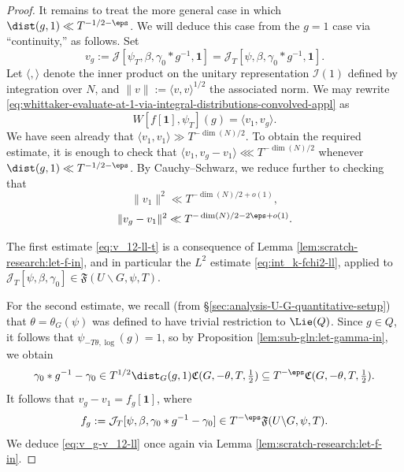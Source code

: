 \begin{proof}
  It remains to treat the more general case in which $\dist(g,1) \ll T^{-1/2-\eps}$.  We will deduce this case from the $g = 1$ case via ``continuity,'' as follows.  Set
  \begin{equation*}
    v_g := \mathcal{J}[\psi_T,\beta,\gamma_0 \ast g^{-1}, \mathbf{1}] = \mathcal{J}_T[\psi,\beta,\gamma_0 \ast g^{-1}, \mathbf{1}].
  \end{equation*}
  Let $\langle ,  \rangle$ denote the inner product on the unitary representation $\mathcal{I}(1)$ defined by integration over $N$, and $\|v\| := \langle v, v \rangle^{1/2}$ the associated norm.  We may rewrite \eqref{eq:whittaker-evaluate-at-1-via-integral-distributions-convolved-appl} as
  \begin{equation*}
    W[f[\mathbf{1}], \psi_T](g) = \langle v_1, v_g \rangle.
  \end{equation*}
  We have seen already that $\langle v_1, v_1 \rangle \gg T^{-\dim(N)/2}$.  To obtain the required estimate, it is enough to check that $\langle v_1, v_g - v_1 \rangle \lll T^{-\dim(N)/2}$ whenever $\dist(g,1) \ll T^{-1/2-\eps}$.  By Cauchy--Schwarz, we reduce further to checking that
  \begin{equation}\label{eq:v_12-ll-t}
    \|v_1\|^2 \ll T^{-\dim(N)/2 + o(1)},
  \end{equation}
  \begin{equation}\label{eq:v_g-v_12-ll}
    \|v_g - v_1\|^2 \ll T^{-\dim(N)/2 - 2 \eps + o(1)}.
  \end{equation}

  The first estimate \eqref{eq:v_12-ll-t} is a consequence of Lemma \ref{lem:scratch-research:let-f-in}, and in particular the $L^2$ estimate \eqref{eq:int_k-fchi2-ll}, applied to $\mathcal{J}_T[\psi,\beta,\gamma_0] \in \mathfrak{F}(U \backslash G, \psi, T)$.

  For the second estimate, we recall (from \S\ref{sec:analysis-U-G-quantitative-setup}) that $\theta = \theta_G(\psi)$ was defined to have trivial restriction to $\Lie(Q)$.  Since $g \in Q$, it follows that $\psi_{- T \theta, \log}(g) = 1$, so by Proposition \ref{lem:sub-gln:let-gamma-in}, we obtain
  \begin{equation*}
    \gamma_0 \ast g^{-1} - \gamma_0 \in T^{1/2} \dist_G(g,1) \mathfrak{C}(G,-\theta,T,\tfrac{1}{2})
    \subseteq
    T^{-\eps} \mathfrak{C}(G,-\theta,T,\tfrac{1}{2}).
  \end{equation*}
  It follows that $v_g - v_1 = f_g[\mathbf{1}]$, where
  \begin{equation*}
    f_g := \mathcal{J}_T[\psi, \beta, \gamma_0 \ast g^{-1} - \gamma_0] \in T^{-\eps} \mathfrak{F}(U \backslash G, \psi, T).
  \end{equation*}
  We deduce \eqref{eq:v_g-v_12-ll} once again via Lemma \ref{lem:scratch-research:let-f-in}.
\end{proof}


